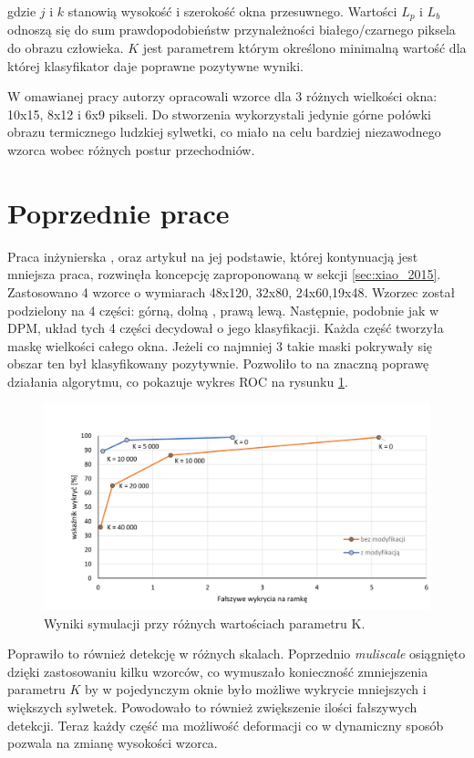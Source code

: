 \noindent gdzie $j$ i $k$ stanowią wysokość i szerokość okna przesuwnego. Wartości $L_p$ i $L_b$ odnoszą się do sum prawdopodobieństw przynależności białego/czarnego piksela do obrazu człowieka. $K$ jest parametrem którym określono minimalną wartość dla której klasyfikator daje poprawne pozytywne wyniki.

W omawianej pracy autorzy opracowali wzorce dla 3 różnych wielkości okna: 10x15, 8x12 i 6x9 pikseli. Do stworzenia wykorzystali jedynie górne połówki obrazu termicznego ludzkiej sylwetki, co miało na celu bardziej niezawodnego wzorca wobec różnych postur przechodniów. 
\section{Poprzednie prace}
Praca inżynierska \cite{kankaing}, oraz artykuł na jej podstawie\cite{kanka2016fpga}, której kontynuacją jest mniejsza praca, rozwinęła koncepcję zaproponowaną w sekcji \ref{sec:xiao_2015}. Zastosowano 4 wzorce o wymiarach 48x120, 32x80, 24x60,19x48. Wzorzec został podzielony na 4 części: górną, dolną , prawą lewą. Następnie, podobnie jak w DPM, układ tych 4 części decydował o jego klasyfikacji. Każda część tworzyła maskę wielkości całego okna. Jeżeli co najmniej 3 takie maski pokrywały się obszar ten był klasyfikowany pozytywnie. Pozwoliło to na znaczną poprawę działania algorytmu, co pokazuje wykres ROC na rysunku \ref{fig:analiza_wykres}. 

	\begin{figure}
	\centering
	\includegraphics[width=0.8\linewidth]{images/Analiza_wykres}
	\caption[Wykres REC]{Wyniki symulacji przy różnych wartościach parametru K.}
	\label{fig:analiza_wykres}
	\end{figure}

Poprawiło to również detekcję w różnych skalach. Poprzednio \textit{muliscale} osiągnięto dzięki zastosowaniu kilku wzorców, co wymuszało konieczność zmniejszenia parametru $K$ by w pojedynczym oknie było możliwe wykrycie mniejszych i większych sylwetek. Powodowało to również zwiększenie ilości fałszywych detekcji. Teraz każdy część ma możliwość deformacji co w dynamiczny sposób pozwala na zmianę wysokości wzorca.





